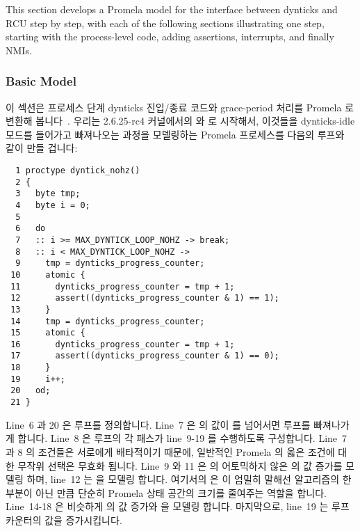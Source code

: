 This section develops a Promela model for the interface between
dynticks and RCU step by step, with each of the following sections
illustrating one step, starting with the process-level code,
adding assertions, interrupts, and finally NMIs.
\fi

\subsubsection{Basic Model}
\label{sec:formal:Basic Model}

이 섹션은 프로세스 단계 dynticks 진입/종료 코드와 grace-period 처리를 Promela
로 변환해 봅니다~\cite{Holzmann03a}.
우리는 2.6.25-rc4 커널에서의  와  로
시작해서, 이것들을 dynticks-idle 모드를 들어가고 빠져나오는 과정을 모델링하는
Promela 프로세스를 다음의 루프와 같이 만들 겁니다:
\iffalse

This section translates the process-level dynticks entry/exit
code and the grace-period processing into
Promela~\cite{Holzmann03a}.
We start with \co{rcu_exit_nohz()} and
\co{rcu_enter_nohz()}
from the 2.6.25-rc4 kernel, placing these in a single Promela
process that models exiting and entering dynticks-idle mode in
a loop as follows:
\fi

{ \scriptsize
\begin{verbatim}
  1 proctype dyntick_nohz()
  2 {
  3   byte tmp;
  4   byte i = 0;
  5
  6   do
  7   :: i >= MAX_DYNTICK_LOOP_NOHZ -> break;
  8   :: i < MAX_DYNTICK_LOOP_NOHZ ->
  9     tmp = dynticks_progress_counter;
 10     atomic {
 11       dynticks_progress_counter = tmp + 1;
 12       assert((dynticks_progress_counter & 1) == 1);
 13     }
 14     tmp = dynticks_progress_counter;
 15     atomic {
 16       dynticks_progress_counter = tmp + 1;
 17       assert((dynticks_progress_counter & 1) == 0);
 18     }
 19     i++;
 20   od;
 21 }
\end{verbatim}
}

Line~6 과 20 은 루프를 정의합니다.
Line~7 은  의 값이  를 넘어서면 루프를
빠져나가게 합니다.
Line~8 은 루프의 각 패스가 line~9-19 를 수행하도록 구성합니다.
Line~7 과 8 의 조건들은 서로에게 배타적이기 때문에, 일반적인 Promela 의 옳은
조건에 대한 무작위 선택은 무효화 됩니다.
Line~9 와 11 은  의 어토믹하지 않은
 의 값 증가를 모델링 하며, line~12 는
 을 모델링 합니다.
여기서의   은  이 엄밀히 말해선 알고리즘의 한 부분이
아닌 만큼 단순히 Promela 상태 공간의 크기를 줄여주는 역할을 합니다.
Line~14-18 은 비슷하게  의 값 증가와  을
모델링 합니다.
마지막으로, line~19 는 루프 카운터의 값을 증가시킵니다.
\iffalse

